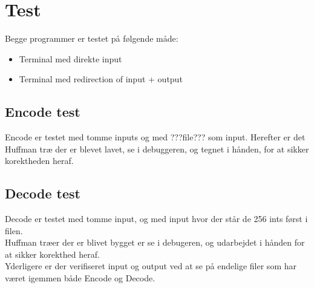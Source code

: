 \documentclass{article}
\begin{document}
\section*{Test}
Begge programmer er testet på følgende måde:
\begin{itemize}
  \item Terminal med direkte input
  \item Terminal med redirection of input + output
\end{itemize}
\bigskip
\subsection*{Encode test}
Encode er testet med tomme inputs og med ???file??? som input.
Herefter er det Huffman træ der er blevet lavet, se i debuggeren, og tegnet i hånden, for at sikker korektheden heraf.\\
\bigskip
\subsection*{Decode test}
Decode er testet med tomme input, og med input hvor der står de 256 ints først i filen. \\
Huffman træer der er blivet bygget er se i debugeren, og udarbejdet i hånden for at sikker korekthed heraf.\\
Yderligere er der verifiseret input og output ved at se på endelige filer som har været igemmen både Encode og Decode.
\end{document}
